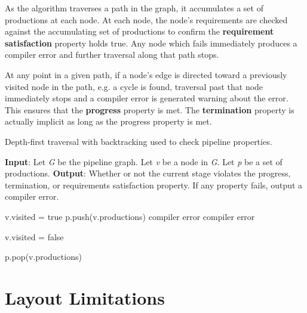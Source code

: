 As the algorithm traverses a path in the graph, it accumulates a set of productions at each node. At each node, the node's requirements are checked against the accumulating set of productions to confirm the \textbf{requirement satisfaction} property holds true. Any node which fails immediately produces a compiler error and further traversal along that path stops.

At any point in a given path, if a node's edge is directed toward a previously visited node in the path, e.g. a cycle is found, traversal past that node immediately stops and a compiler error is generated warning about the error. This ensures that the \textbf{progress} property is met. The \textbf{termination} property is actually implicit as long as the progress property is met. 

\begin{algorithm}
 \caption{Depth-first traversal with backtracking used to check pipeline properties.}
 \label{alg:dfs}
 \begin{algorithmic}
 \State
 \State \textbf{Input}: Let \textit{G} be the pipeline graph. Let \textit{v} be a node in \textit{G}. Let \textit{p} be a set of productions.
 \State \textbf{Output}: Whether or not the current stage violates the progress, termination, or requirements satisfaction property. If any property fails, output a compiler error.
 \State 
 
 	\State v.visited = true
 	\State p.push(v.productions)
 				\State {}
 			\Else
 				\State \Return compiler error
 			\EndIf
 		\EndFor
	\Else 	
 		\State \Return compiler error
 	\EndIf
 	
 	\State v.visited = false 
 	
 	\State p.pop(v.productions) 
 \EndFunction
 \end{algorithmic}
 
\end{algorithm}
 
\section{Layout Limitations} \label{layout_guide}

